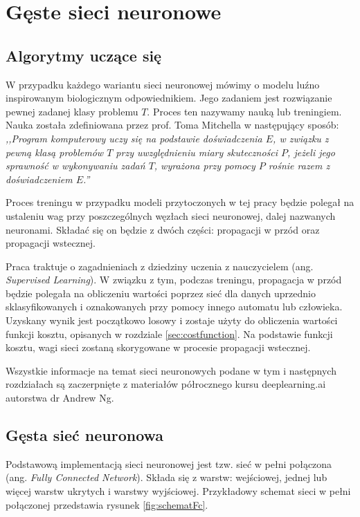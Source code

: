 \chapter{Gęste sieci neuronowe}
\label{chap:siecifc}

\section{Algorytmy uczące się}

W przypadku każdego wariantu sieci neuronowej mówimy o modelu luźno inspirowanym biologicznym odpowiednikiem. Jego zadaniem jest rozwiązanie pewnej zadanej klasy problemu \(T\). Proces ten nazywamy nauką lub treningiem. Nauka została zdefiniowana przez prof. Toma Mitchella w następujący sposób:
\textit{,,Program komputerowy uczy się na podstawie doświadczenia \(E\), w związku z pewną klasą problemów \(T\) przy uwzględnieniu miary skuteczności \(P\), jeżeli jego sprawność w wykonywaniu zadań \(T\), wyrażona przy pomocy \(P\)
rośnie razem z doświadczeniem \(E\).''}

Proces treningu w przypadku modeli przytoczonych w tej pracy będzie polegał na ustaleniu wag przy poszczególnych węzłach sieci neuronowej, dalej nazwanych neuronami. Składać się on będzie z dwóch części: propagacji w przód oraz propagacji wstecznej. 

Praca traktuje o zagadnieniach z dziedziny uczenia z nauczycielem (ang. \textit{Supervised Learning}). W związku z tym, podczas treningu, propagacja w przód będzie polegała na obliczeniu wartości poprzez sieć dla danych uprzednio sklasyfikowanych i oznakowanych przy pomocy innego automatu lub człowieka.
Uzyskany wynik jest początkowo losowy i zostaje użyty do obliczenia wartości funkcji kosztu, opisanych w rozdziale \ref{sec:costfunction}.
Na podstawie funkcji kosztu, wagi sieci zostaną skorygowane w procesie propagacji wstecznej.

Wszystkie informacje na temat sieci neuronowych podane w tym i następnych rozdziałach są zaczerpnięte z materiałów półrocznego kursu deeplearning.ai \cite{deeplearningai} autorstwa dr Andrew Ng.

\section{Gęsta sieć neuronowa}

Podstawową implementacją sieci neuronowej jest tzw. sieć w pełni połączona (ang. \textit{Fully Connected Network}). Składa się z warstw: wejściowej, jednej lub więcej warstw ukrytych i warstwy wyjściowej. Przykładowy schemat sieci w pełni połączonej przedstawia rysunek \ref{fig:schematFc}.

